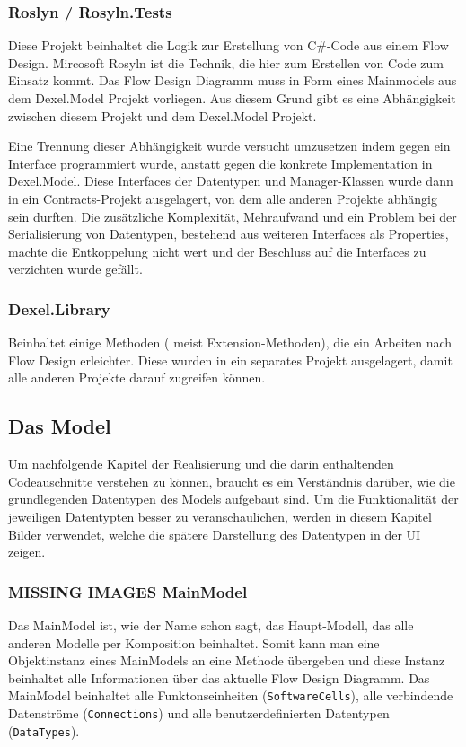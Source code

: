 \subsubsection{Roslyn / Rosyln.Tests}
\label{sec:orgheadline3}
Diese Projekt beinhaltet die Logik zur Erstellung von C\#-Code aus einem Flow
Design. Mircosoft Rosyln ist die Technik, die hier zum Erstellen von Code zum
Einsatz kommt.
Das Flow Design Diagramm muss in Form eines Mainmodels aus dem
Dexel.Model Projekt vorliegen. Aus diesem Grund gibt es eine Abhängigkeit
zwischen diesem Projekt und dem Dexel.Model Projekt. 

Eine Trennung dieser Abhängigkeit wurde versucht umzusetzen indem gegen ein Interface
programmiert wurde, anstatt gegen die konkrete Implementation in
Dexel.Model. Diese Interfaces der Datentypen und Manager-Klassen wurde dann
in ein Contracts-Projekt ausgelagert, von dem alle anderen Projekte abhängig
sein durften. Die zusätzliche Komplexität, Mehraufwand und ein Problem bei
der Serialisierung von Datentypen, bestehend aus weiteren Interfaces als
Properties, machte die Entkoppelung nicht wert und der Beschluss auf die
Interfaces zu verzichten wurde gefällt.

\subsubsection{Dexel.Library}
\label{sec:orgheadline4}
Beinhaltet einige Methoden ( meist Extension-Methoden), die ein Arbeiten
nach Flow Design erleichter. Diese wurden in ein separates Projekt
ausgelagert, damit alle anderen Projekte darauf zugreifen können.

\subsection{Das Model}
\label{sec:orgheadline14}
Um nachfolgende Kapitel der Realisierung und die darin enthaltenden
Codeauschnitte verstehen zu können, braucht es ein Verständnis darüber, wie die
grundlegenden Datentypen des Models aufgebaut sind. Um die Funktionalität der
jeweiligen Datentypten besser zu veranschaulichen, werden in diesem Kapitel
Bilder verwendet, welche die spätere Darstellung des Datentypen in der UI zeigen.

\subsubsection{{\bfseries\sffamily MISSING IMAGES} MainModel}
\label{sec:orgheadline6}
Das MainModel ist, wie der Name schon sagt, das Haupt-Modell, das alle
anderen Modelle per Komposition beinhaltet. Somit kann man eine Objektinstanz
eines MainModels an eine Methode übergeben und diese Instanz beinhaltet alle
Informationen über das aktuelle Flow Design Diagramm. 
Das MainModel beinhaltet alle Funktonseinheiten (\texttt{SoftwareCells}), alle verbindende
Datenströme (\texttt{Connections}) und alle benutzerdefinierten Datentypen (\texttt{DataTypes}).


